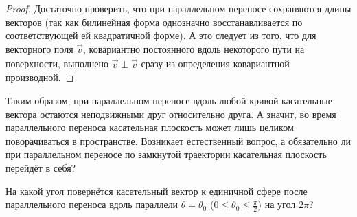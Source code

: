 \begin{proof}
	Достаточно проверить, что при параллельном переносе сохраняются длины векторов (так как билинейная форма однозначно восстанавливается по соответствующей ей квадратичной форме). А это следует из того, что для векторного поля $\vec{v}$, ковариантно постоянного вдоль некоторого пути на поверхности, выполнено $\vec{v} \perp \dot{\vec{v}}$ сразу из определения ковариантной производной.
\end{proof}

Таким образом, при параллельном переносе вдоль любой кривой касательные вектора остаются неподвижными друг относительно друга. А значит, во время параллельного переноса касательная плоскость может лишь целиком поворачиваться в пространстве. Возникает естественный вопрос, а обязательно ли при параллельном переносе по замкнутой траектории касательная плоскость перейдёт в себя?

\begin{problem} \label{problem:SphereTranslation}
	На какой угол повернётся касательный вектор к единичной сфере после параллельного переноса вдоль параллели $\theta = \theta_0$ ($0 \leqslant \theta_0 \leqslant \frac{\pi}{2}$) на угол $2\pi$?
\end{problem}


